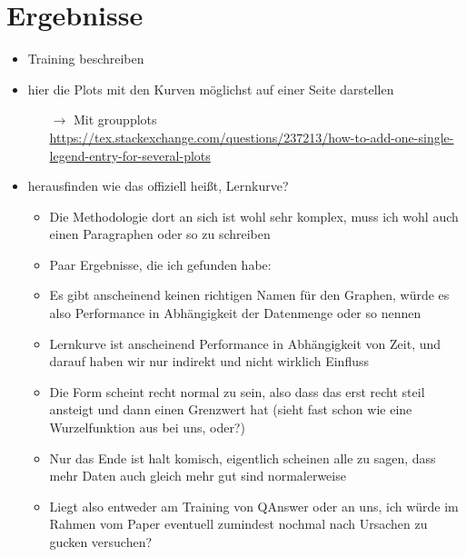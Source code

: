 \documentclass[utf8,biblatex]{lni}
\begin{document}
\section{Ergebnisse}

\begin{itemize}
  \item Training beschreiben
  \item hier die Plots mit den Kurven möglichst auf einer Seite darstellen
  \begin{itemize}
    \item[$\rightarrow$] Mit groupplots \url{https://tex.stackexchange.com/questions/237213/how-to-add-one-single-legend-entry-for-several-plots}
  \end{itemize}
  \item herausfinden wie das offiziell heißt, Lernkurve?
  \begin{itemize}
    \item Die Methodologie dort an sich ist wohl sehr komplex, muss ich wohl auch einen Paragraphen oder so zu schreiben
    \item Paar Ergebnisse, die ich gefunden habe:
    \item Es gibt anscheinend keinen richtigen Namen für den Graphen, würde es also Performance in Abhängigkeit der Datenmenge oder so nennen
    \item Lernkurve ist anscheinend Performance in Abhängigkeit von Zeit, und darauf haben wir nur indirekt und nicht wirklich Einfluss
    \item Die Form scheint recht normal zu sein, also dass das erst recht steil ansteigt und dann einen Grenzwert hat (sieht fast schon wie eine Wurzelfunktion aus bei uns, oder?)
    \item Nur das Ende ist halt komisch, eigentlich scheinen alle zu sagen, dass mehr Daten auch gleich mehr gut sind normalerweise
    \item Liegt also entweder am Training von QAnswer oder an uns, ich würde im Rahmen vom Paper eventuell zumindest nochmal nach Ursachen zu gucken versuchen?
  \end{itemize}
\end{itemize}
\end{document}
